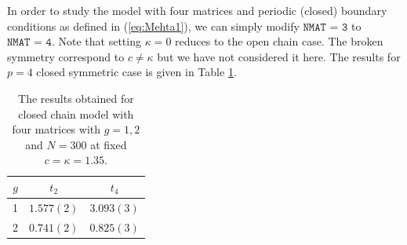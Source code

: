 \documentclass[letter,11pt]{article}
\begin{document}
In order to study the model with four matrices and periodic (closed) boundary conditions 
as defined in (\ref{eq:Mehta1}), we can simply modify $\texttt{NMAT = 3}$ to $\texttt{NMAT = 4}$. Note that setting $\kappa=0$ reduces to the open chain case. The broken symmetry correspond to $ c \neq \kappa$ but we have not considered it here. The results for $p=4$ closed symmetric case is given in Table \ref{table:4mchain_data}. 
\begin{table}[h!]
	\centering
	\begin{tabular}{||c c c||} 
		\hline
		$g$ & $ t_2 $ & $t_4 $ \\ [0.5ex] 
		\hline\hline
		1 & $ 1.577(2) $ & $3.093(3)$ \\
		2 & $ 0.741(2)$ & $0.825(3) $  
		\\ [1ex] 
		\hline 
	\end{tabular}
	\caption{The results obtained for closed chain model with four matrices with $g=1,2$ and $N=300$ at fixed $c=\kappa=1.35$.}
	\label{table:4mchain_data}
\end{table}
\end{document}
